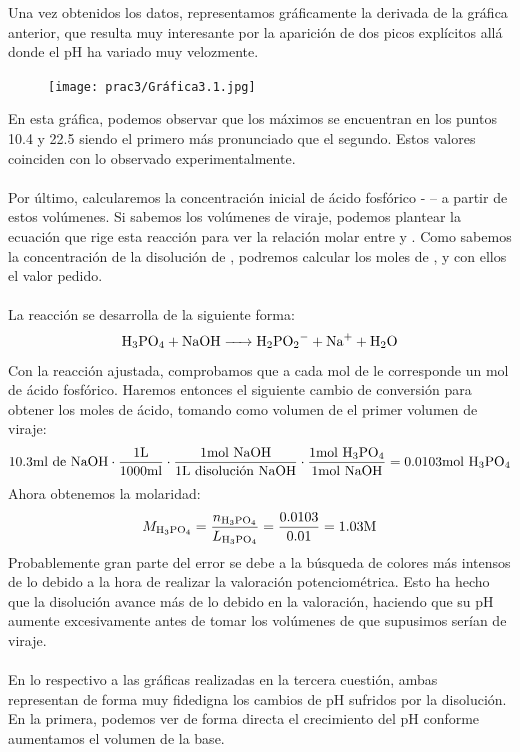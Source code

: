 \noindent Una vez obtenidos los datos, representamos gráficamente la derivada de la gráfica anterior, que resulta muy interesante por la aparición de dos picos explícitos allá donde el pH ha variado muy velozmente.

\begin{figure}[H]
    \centering
    \hspace*{-2.3cm}
        \texttt{[image: prac3/Gráfica3.1.jpg]}
    \hspace*{-2.3cm}
\end{figure}
\clearpage

\noindent En esta gráfica, podemos observar que los máximos se encuentran en los puntos 10.4 y 22.5 siendo el primero más pronunciado que el segundo. Estos valores coinciden con lo observado experimentalmente.\\\\
\noindent Por último, calcularemos la concentración inicial de ácido fosfórico -  – a partir de estos volúmenes. Si sabemos los volúmenes de viraje, podemos plantear la ecuación que rige esta reacción para ver la relación molar entre  y . Como sabemos la concentración de la disolución de , podremos calcular los moles de , y con ellos el valor pedido.\\\\
\noindent La reacción se desarrolla de la siguiente forma:
\[\ce{H3PO4 + NaOH -> H2PO2^- + Na^+ + H2O}\]
Con la reacción ajustada, comprobamos que a cada mol de  le corresponde un mol de ácido fosfórico. Haremos entonces el siguiente cambio de conversión para obtener los moles de ácido, tomando como volumen de  el primer volumen de viraje:
\[10.3\si{ml}\ \text{de}\ \ce{NaOH}\cdot\frac{1\si{L}}{1000\si{ml}}\cdot \frac{1\si{mol}\ \ce{NaOH}}{1\si{L}\ \text{disolución}\ \ce{NaOH}}\cdot\frac{1\si{mol}\ \ce{H3PO4}}{1\si{mol}\ \ce{NaOH}} = 0.0103\si{mol}\ \ce{H3PO4}\]
Ahora obtenemos la molaridad:
\[M_{\ce{H3PO4}} = \frac{n_{\ce{H3PO4}}}{L_{\ce{H3PO4}}} = \frac{0.0103}{0.01} = 1.03\si{M}\]
\noindent Probablemente gran parte del error se debe a la búsqueda de colores más intensos de lo debido a la hora de realizar la valoración potenciométrica. Esto ha hecho que la disolución avance más de lo debido en la valoración, haciendo que su pH aumente excesivamente antes de tomar los volúmenes de  que supusimos serían de viraje.\\\\
\noindent En lo respectivo a las gráficas realizadas en la tercera cuestión, ambas representan de forma muy fidedigna los cambios de pH sufridos por la disolución. En la primera, podemos ver de forma directa el crecimiento del pH conforme aumentamos el volumen de la base. 
